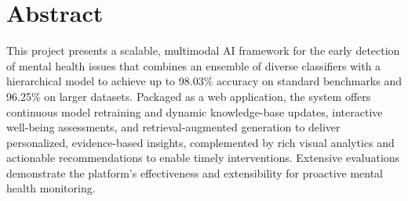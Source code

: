 

\section*{Abstract} 




\noindent
This project presents a scalable, multimodal AI framework for the early detection of mental health issues that combines an ensemble of diverse classifiers with a hierarchical model to achieve up to 98.03\% accuracy on standard benchmarks and 96.25\% on larger datasets. Packaged as a web application, the system offers continuous model retraining and dynamic knowledge-base updates, interactive well-being assessments, and retrieval-augmented generation to deliver personalized, evidence-based insights, complemented by rich visual analytics and actionable recommendations to enable timely interventions. Extensive evaluations demonstrate the platform’s effectiveness and extensibility for proactive mental health monitoring.




